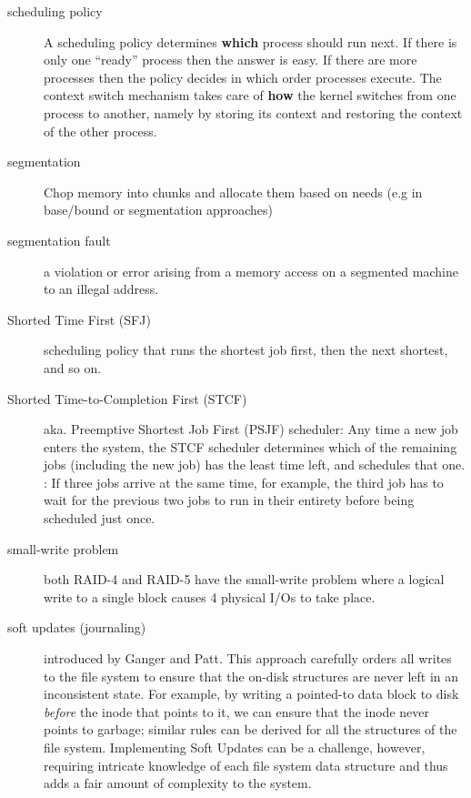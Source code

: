 \begin{description}
\item[scheduling policy] A scheduling policy determines \textbf{which} process should run next. If there is only one “ready” process then the answer is easy. If there are more processes then the policy decides in which order processes
execute. The context switch mechanism takes care of \textbf{how} the kernel switches from one process to another, namely by storing its context and restoring the context of the other process.

\item[segmentation] Chop memory into  chunks and allocate them based on needs (e.g in base/bound or segmentation approaches)

\item[segmentation fault] a violation or error arising from a memory access on a segmented machine to an illegal address.

\item[Shorted Time First (SFJ)]  scheduling policy that runs the shortest job first, then the next shortest, and so on.

\item[Shorted Time-to-Completion First (STCF)] aka. Preemptive Shortest Job First (PSJF) scheduler: Any time a new job enters the system, the STCF scheduler determines which of the remaining jobs (including the new job) has the least time left, and schedules that one. : If three jobs arrive at the same time, for example, the third job has to wait for the previous two jobs to run in their entirety before being scheduled just once.

\item[small-write problem] both RAID-4 and RAID-5 have the small-write problem where a logical write to a single block causes 4 physical I/Os to take place.

\item[soft updates (journaling)] introduced by Ganger and Patt. This approach carefully orders all writes to the file system to ensure that the on-disk structures are never left in an inconsistent state. For example, by writing a pointed-to data block to disk \emph{before} the inode that points to it, we can ensure that the inode never points to garbage; similar rules can be derived for all the structures of the file system. Implementing Soft Updates can be a challenge, however, requiring
intricate knowledge of each file system data structure and thus adds a fair amount of complexity to the system.


\end{description}
